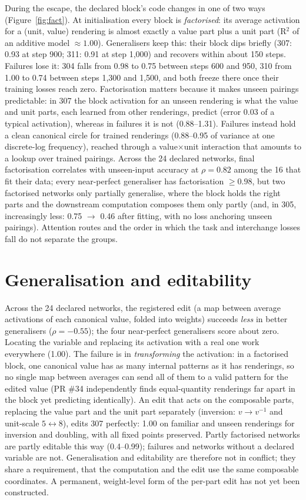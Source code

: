 \documentclass[11pt]{article}
\begin{document}
During the escape, the declared block's code changes in one of two ways (Figure~\ref{fig:fact}). At initialisation
every block is \emph{factorised}: its average activation for a (unit, value) rendering is almost exactly a value part
plus a unit part (R$^2$ of an additive model $\approx 1.00$). Generalisers keep this: their block dips briefly (307:
0.93 at step 900; 311: 0.91 at step 1,000) and recovers within about 150 steps. Failures lose it: 304 falls from 0.98
to 0.75 between steps 600 and 950, 310 from 1.00 to 0.74 between steps 1,300 and 1,500, and both freeze there once
their training losses reach zero. Factorisation matters because it makes unseen pairings predictable: in 307 the
block activation for an unseen rendering is what the value and unit parts, each learned from other renderings, predict
(error 0.03 of a typical activation), whereas in failures it is not (0.88--1.31). Failures instead hold a clean
canonical circle for trained renderings (0.88--0.95 of variance at one discrete-log frequency), reached through a
value$\times$unit interaction that amounts to a lookup over trained pairings. Across the 24 declared networks, final
factorisation correlates with unseen-input accuracy at $\rho=0.82$ among the 16 that fit their data; every
near-perfect generaliser has factorisation $\ge 0.98$, but two factorised networks only partially generalise, where
the block holds the right parts and the downstream computation composes them only partly (and, in 305, increasingly
less: 0.75 $\to$ 0.46 after fitting, with no loss anchoring unseen pairings). Attention routes and the order in which
the task and interchange losses fall do not separate the groups.

\section{Generalisation and editability}
Across the 24 declared networks, the registered edit (a map between average activations of each canonical value,
folded into weights) succeeds \emph{less} in better generalisers ($\rho=-0.55$); the four near-perfect generalisers
score about zero. Locating the variable and replacing its activation with a real one work everywhere (1.00). The
failure is in \emph{transforming} the activation: in a factorised block, one canonical value has as many internal
patterns as it has renderings, so no single map between averages can send all of them to a valid pattern for the
edited value (PR \#34 independently finds equal-quantity renderings far apart in the block yet predicting
identically). An edit that acts on the composable parts, replacing the value part and the unit part separately
(inversion: $v\to v^{-1}$ and unit-scale $5\leftrightarrow 8$), edits 307 perfectly: 1.00 on familiar and unseen
renderings for inversion and doubling, with all fixed points preserved. Partly factorised networks are partly
editable this way (0.4--0.99); failures and networks without a declared variable are not. Generalisation and
editability are therefore not in conflict; they share a requirement, that the computation and the edit use the same
composable coordinates. A permanent, weight-level form of the per-part edit has not yet been constructed.
\end{document}
